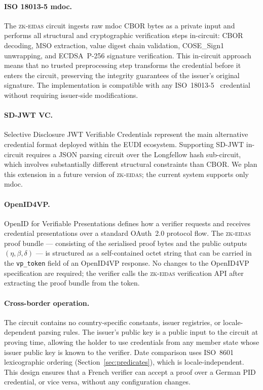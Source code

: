 \paragraph{ISO 18013-5 mdoc.}
The \textsc{zk-eidas} circuit ingests raw mdoc CBOR bytes as a private
input and performs all structural and cryptographic verification
steps in-circuit: CBOR decoding, MSO extraction, value digest chain
validation, COSE\_Sign1 unwrapping, and ECDSA~P-256 signature
verification.
This in-circuit approach means that no trusted preprocessing step
transforms the credential before it enters the circuit, preserving the
integrity guarantees of the issuer's original signature.
The implementation is compatible with any ISO~18013-5~\cite{iso18013}
credential without requiring issuer-side modifications.

\paragraph{SD-JWT VC.}
Selective Disclosure JWT Verifiable Credentials represent the main
alternative credential format deployed within the EUDI ecosystem.
Supporting SD-JWT in-circuit requires a JSON parsing circuit over the
Longfellow hash sub-circuit, which involves substantially different
structural constraints than CBOR.
We plan this extension in a future version of \textsc{zk-eidas}; the
current system supports only mdoc.

\paragraph{OpenID4VP.}
OpenID for Verifiable Presentations defines how a verifier requests
and receives credential presentations over a standard OAuth~2.0
protocol flow.
The \textsc{zk-eidas} proof bundle --- consisting of the serialised
proof bytes and the public outputs $(\eta, \beta, \delta)$ --- is
structured as a self-contained octet string that can be carried in the
\texttt{vp\_token} field of an OpenID4VP response.
No changes to the OpenID4VP specification are required; the verifier
calls the \textsc{zk-eidas} verification API after extracting the
proof bundle from the token.

\paragraph{Cross-border operation.}
The circuit contains no country-specific constants, issuer registries,
or locale-dependent parsing rules.
The issuer's public key is a public input to the circuit at proving
time, allowing the holder to use credentials from any member state
whose issuer public key is known to the verifier.
Date comparison uses ISO~8601 lexicographic ordering
(Section~\ref{sec:predicates}), which is locale-independent.
This design ensures that a French verifier can accept a proof over a
German PID credential, or vice versa, without any configuration
changes.

